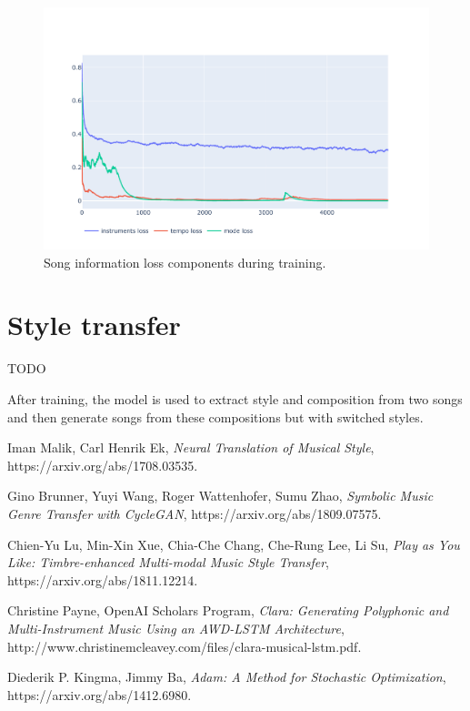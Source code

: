 \documentclass[en]{pracamgr}
\begin{document}
\begin{figure}
    \centering
    \includegraphics[width=\linewidth]{figures/song-info.pdf}
    \caption{Song information loss components during training.}
    \label{fig:song_info}
\end{figure}

\section{Style transfer}

TODO

After training, the model is used to extract style and composition from two songs and then generate songs from these compositions but with switched styles.

\begin{thebibliography}{99}

 Iman Malik, Carl Henrik Ek, \textit{Neural Translation of Musical Style}, https://arxiv.org/abs/1708.03535.

 Gino Brunner, Yuyi Wang, Roger Wattenhofer, Sumu Zhao, \textit{Symbolic Music Genre Transfer with CycleGAN}, https://arxiv.org/abs/1809.07575.

 Chien-Yu Lu, Min-Xin Xue, Chia-Che Chang, Che-Rung Lee, Li Su, \textit{Play as You Like: Timbre-enhanced Multi-modal Music Style Transfer}, https://arxiv.org/abs/1811.12214.

 Christine Payne, OpenAI Scholars Program, \textit{Clara: Generating Polyphonic and Multi-Instrument Music Using an AWD-LSTM Architecture}, http://www.christinemcleavey.com/files/clara-musical-lstm.pdf.

 Diederik P. Kingma, Jimmy Ba, \textit{Adam: A Method for Stochastic Optimization}, https://arxiv.org/abs/1412.6980.

\end{thebibliography}
\end{document}
